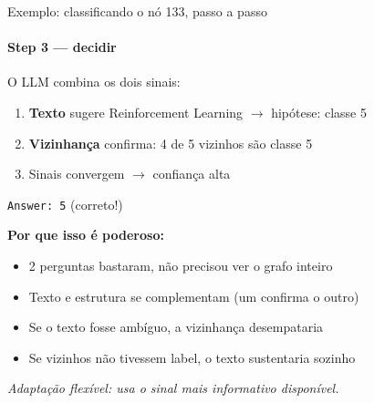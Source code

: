 \documentclass{beamer}
\begin{document}
\begin{frame}{Exemplo: classificando o nó 133, passo a passo}
  \framesubtitle{Step 3 --- decidir}

  O LLM combina os dois sinais:

  \vspace{0.5em}
  \begin{enumerate}
    \item \textbf{Texto} sugere Reinforcement Learning $\rightarrow$ hipótese: classe 5
    \item \textbf{Vizinhança} confirma: 4 de 5 vizinhos são classe 5
    \item Sinais convergem $\rightarrow$ confiança alta
  \end{enumerate}

  \vspace{0.3em}
  \begin{center}
    \large \texttt{Answer: 5} \quad (correto!)
  \end{center}

  \vspace{0.5em}
  \textbf{Por que isso é poderoso:}
  \begin{itemize}
    \item 2 perguntas bastaram, não precisou ver o grafo inteiro
    \item Texto e estrutura se complementam (um confirma o outro)
    \item Se o texto fosse ambíguo, a vizinhança desempataria
    \item Se vizinhos não tivessem label, o texto sustentaria sozinho
  \end{itemize}

  \vspace{0.3em}
  \emph{Adaptação flexível: usa o sinal mais informativo disponível.}
\end{frame}

\end{document}
